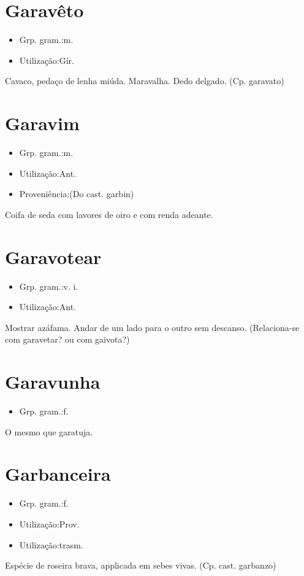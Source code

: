 \section{Garavêto}
\begin{itemize}
\item {Grp. gram.:m.}
\end{itemize}
\begin{itemize}
\item {Utilização:Gír.}
\end{itemize}
Cavaco, pedaço de lenha miúda.
Maravalha.
Dedo delgado.
(Cp. \textunderscore garavato\textunderscore )
\section{Garavim}
\begin{itemize}
\item {Grp. gram.:m.}
\end{itemize}
\begin{itemize}
\item {Utilização:Ant.}
\end{itemize}
\begin{itemize}
\item {Proveniência:(Do cast. \textunderscore garbin\textunderscore )}
\end{itemize}
Coifa de seda com lavores de oiro e com renda adeante.
\section{Garavotear}
\begin{itemize}
\item {Grp. gram.:v. i.}
\end{itemize}
\begin{itemize}
\item {Utilização:Ant.}
\end{itemize}
Mostrar azáfama.
Andar de um lado para o outro sem descanso.
(Relaciona-se com \textunderscore garavetar\textunderscore ? ou com \textunderscore gaivota\textunderscore ?)
\section{Garavunha}
\begin{itemize}
\item {Grp. gram.:f.}
\end{itemize}
O mesmo que \textunderscore garatuja\textunderscore .
\section{Garbanceira}
\begin{itemize}
\item {Grp. gram.:f.}
\end{itemize}
\begin{itemize}
\item {Utilização:Prov.}
\end{itemize}
\begin{itemize}
\item {Utilização:trasm.}
\end{itemize}
Espécie de roseira brava, applicada em sebes vivas.
(Cp. cast. \textunderscore garbanzo\textunderscore )

